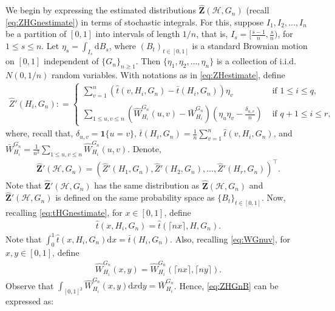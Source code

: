 \documentclass[11pt,reqno]{amsart}
\numberwithin{equation}{section}
\newcommand{\cH}{{\mathcal H}}
\theoremstyle{definition}
\begin{document}
We begin by expressing the estimated distributions $\hat {\bm Z}(\cH, G_{n})$ (recall \eqref{eq:ZHGnestimate}) in terms of stochastic integrals. For this, suppose $I_1, I_2, \ldots, I_n$ be a partition of $[0, 1]$ into intervals of length $1/n$, that is, $I_s = [ \frac{s-1}{n}, \frac{s}{n})$, for $1 \leq s \leq n$. Let $\eta_s = \int_{I_s} \mathrm d B_s$, where $\left(B_{t}\right)_{t\in[0,1]}$ is a standard Brownian motion on $[0,1]$ independent of $\{G_{n}\}_{n\geq 1}$. Then $\{\eta_1, \eta_2, \ldots, \eta_n\}$ is a collection of i.i.d. $N(0, 1/n)$ random variables.  With notations as in \eqref{eq:ZHestimate}, define 
\begin{align}\label{eq:ZHGnB}
    \hat Z'(H_{i}, G_{n}) : = 
    \begin{cases}
        \sum_{v=1}^{n} ( \hat t(v, H_i, G_n) -  \bar t(H_i, G_n) ) \eta_v  & \text{ if }  1 \leq i \leq q, \\ \\ 
   \sum_{1 \leq u, v \leq n} ( \hat W^{G_n}_{H_i}(u, v) - \bar W^{G_n}_{H_i} ) \left(\eta_{u}\eta_{v} - \frac{\delta_{u, v}}{n} \right) & \text{ if } q+1 \leq i \leq  r , 
    \end{cases}
\end{align} 
where, recall that, $\delta_{u, v} = \bm 1\{u=v\}$, $\bar t(H_i, G_n) = \frac{1}{n} \sum_{v=1}^n \hat t(v, H_i, G_n)$, and $\bar W^{G_n}_{H_i} = \frac{1}{n^2} \sum_{1 \leq u, v \leq n} \hat W^{G_n}_{H_i}(u, v)$. Denote, 
\begin{align}\label{eq:ZHB}
\hat{\bm Z}'( \mathcal{H}, G_{n}) = (\hat Z'( H_1, G_{n}), \hat Z'( H_2, G_{n}), \ldots, \hat Z'( H_r, G_{n})) ^\top . 
\end{align}  
Note that $\hat{\bm Z}'( \mathcal H, G_{n})$ has the same distribution as $\hat{\bm Z}(\mathcal H, G_n)$ and $\hat{\bm Z}'( \mathcal H, G_{n})$ is defined on the same probability space as $\{B_t\}_{t \in [0, 1]}$. Now, recalling \eqref{eq:tHGnestimate}, for $x \in [0, 1]$, define 
\begin{align}\label{eq:tHGnestimatefn} 
\hat t( x , H_i, G_n) = \hat t( \lceil n x \rceil, H, G_n) . 
\end{align} 
Note that $\int_0^1 \hat t( x, H_i, G_n) \mathrm d x = \bar t(H_i, G_n)$. Also, recalling \eqref{eq:WGnuv}, for $x, y \in [0, 1]$, define 
\begin{align}\label{eq:WGnHestimate} 
\hat W^{G_n}_{H_i}(x, y) = \hat W^{G_n}_{H_i}( \lceil n x \rceil, \lceil n y \rceil) . 
\end{align} 
Observe that $\int_{[0, 1]^2} \hat W^{G_n}_{H_i}(x, y) \mathrm d x \mathrm d y = \bar W^{G_n}_{H_i}$. Hence, \eqref{eq:ZHGnB} can be expressed as: 
\end{document}
